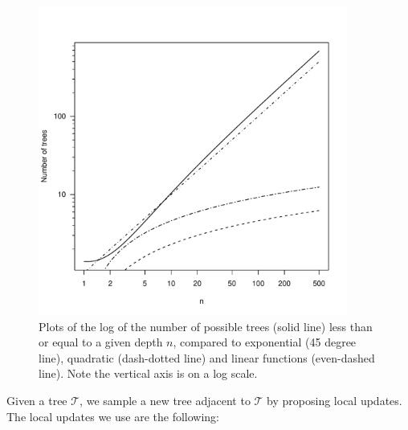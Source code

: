 \begin{figure}[H]
  \centering
  \includegraphics[width=4in]{figures/asymptotics_plot_bw.pdf}
  \caption{Plots of the log of the number of possible trees (solid line) less than or equal to a given depth $n$, compared to exponential (45 degree line), quadratic (dash-dotted line) and linear functions (even-dashed line). Note the vertical axis is on a log scale.  }
  \label{fig:asymptotics}
\end{figure}

Given a tree $\mathcal{T}$, we sample a new tree adjacent to $\mathcal{T}$ by proposing local updates. The local updates we use are the following: 

